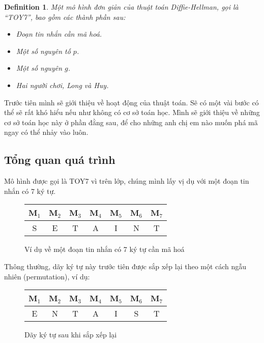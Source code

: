 \documentclass[a4paper,12pt]{article}
\newtheorem{definition}{Definition}[section]
\newenvironment{fdefinition}
    {\begin{mdframed}\begin{definition}}
    {\end{definition}\end{mdframed}}
\begin{document}
\begin{fdefinition}
    Một mô hình đơn giản của thuật toán Diffie-Hellman, gọi là ``TOY7'', bao gồm các thành phần sau:
    \begin{itemize}
        \item Đoạn tin nhắn cần mã hoá.
        \item Một số nguyên tố $p$.
        \item Một số nguyên $g$.
        \item Hai người chơi, Long và Huy.
    \end{itemize}
\end{fdefinition}

Trước tiên mình sẽ giới thiệu về hoạt động của thuật toán. Sẽ có một vài bước có thể sẽ rất khó hiểu
nếu như không có cơ sở toán học. Mình sẽ giới thiệu về những cơ sở toán học này ở phần đằng sau,
để cho những anh chị em nào muốn phá mã ngay có thể nhảy vào luôn.

\subsection*{Tổng quan quá trình}

Mô hình được gọi là TOY7 vì trên lớp, chúng mình lấy vị dụ với một đoạn tin nhắn có 7 ký tự.

\begin{figure}[H]
    \centering
    \begin{tabular}{c c c c c c c}
        \toprule
        M$_1$ & M$_2$ & M$_3$ & M$_4$ & M$_5$ & M$_6$ & M$_7$ \\
        \midrule
        S     & E     & T     & A     & I     & N     & T     \\
        \bottomrule
    \end{tabular}
    \caption{Ví dụ về một đoạn tin nhắn có 7 ký tự cần mã hoá}
\end{figure}

Thông thường, dãy ký tự này trước tiên được sắp xếp lại theo một cách ngẫu nhiên (permutation),
ví dụ:

\begin{figure}[H]
    \centering
    \begin{tabular}{c c c c c c c}
        \toprule
        M$_1$ & M$_2$ & M$_3$ & M$_4$ & M$_5$ & M$_6$ & M$_7$ \\
        \midrule
        E     & N     & T     & A     & I     & S     & T     \\
        \bottomrule
    \end{tabular}
    \caption{Dãy ký tự sau khi sắp xếp lại}
\end{figure}
\end{document}

